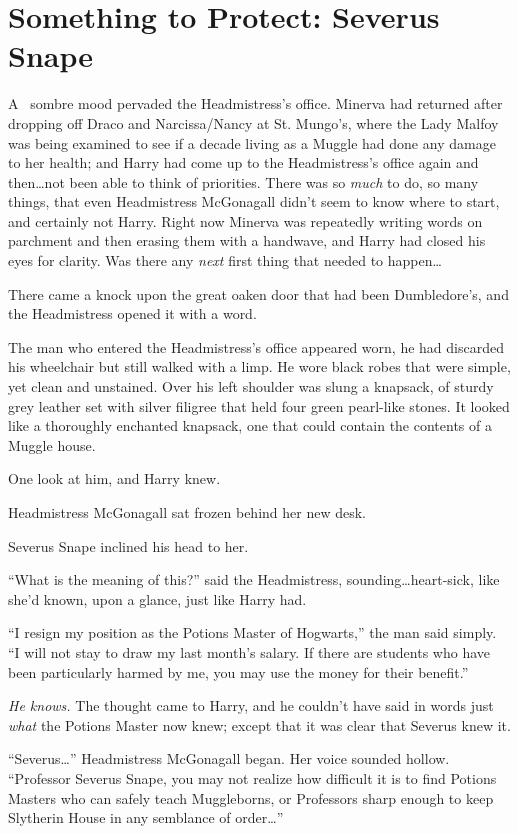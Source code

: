 \chapter{Something to Protect: Severus Snape}

\lettrine{A}{~} sombre mood
pervaded the Headmistress’s office. Minerva had returned after dropping off Draco and Narcissa/Nancy at St. Mungo’s, where the Lady Malfoy was being examined to see if a decade living as a Muggle had done any damage to her health; and Harry had come up to the Headmistress’s office again and then…not been able to think of priorities. There was so \emph{much} to do, so many things, that even Headmistress McGonagall didn’t seem to know where to start, and certainly not Harry. Right now Minerva was repeatedly writing words on parchment and then erasing them with a handwave, and Harry had closed his eyes for clarity. Was there any \emph{next} first thing that needed to happen…

There came a knock upon the great oaken door that had been Dumbledore’s, and the Headmistress opened it with a word.

The man who entered the Headmistress’s office appeared worn, he had discarded his wheelchair but still walked with a limp. He wore black robes that were simple, yet clean and unstained. Over his left shoulder was slung a knapsack, of sturdy grey leather set with silver filigree that held four green pearl-like stones. It looked like a thoroughly enchanted knapsack, one that could contain the contents of a Muggle house.

One look at him, and Harry knew.

Headmistress McGonagall sat frozen behind her new desk.

Severus Snape inclined his head to her.

“What is the meaning of this?” said the Headmistress, sounding…heart-sick, like she’d known, upon a glance, just like Harry had.

“I resign my position as the Potions Master of Hogwarts,” the man said simply. “I will not stay to draw my last month’s salary. If there are students who have been particularly harmed by me, you may use the money for their benefit.”

\emph{He knows.} The thought came to Harry, and he couldn’t have said in words just \emph{what} the Potions Master now knew; except that it was clear that Severus knew it.

“Severus…” Headmistress McGonagall began. Her voice sounded hollow. “Professor Severus Snape, you may not realize how difficult it is to find Potions Masters who can safely teach Muggleborns, or Professors sharp enough to keep Slytherin House in any semblance of order…”

